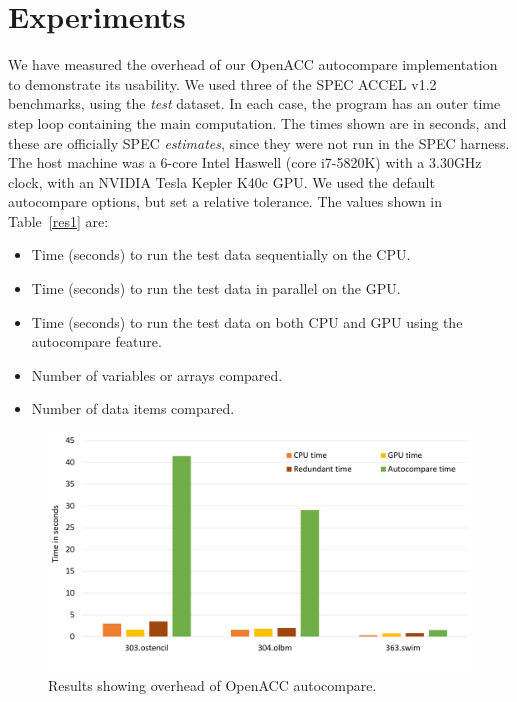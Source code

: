 \section{Experiments}

We have measured the overhead of our OpenACC autocompare implementation to demonstrate its usability.
We used three of the SPEC ACCEL v1.2 benchmarks, using the \emph{test} dataset.
In each case, the program has an outer time step loop containing the main computation.
The times shown are in seconds, and these are officially SPEC \emph{estimates}, since they were not run in the SPEC harness.
The host machine was a 6-core Intel Haswell (core i7-5820K) with a 3.30GHz clock, with an NVIDIA Tesla Kepler K40c GPU.
We used the default autocompare options, but set a relative tolerance.
The values shown in Table~\ref{res1} are:
\begin{itemize}
\item Time (seconds) to run the test data sequentially on the CPU.
\item Time (seconds) to run the test data in parallel on the GPU.
\item Time (seconds) to run the test data on both CPU and GPU using the autocompare feature.
\item Number of variables or arrays compared.
\item Number of data items compared.
\end{itemize}



\begin{figure}[t]
    \centering
    \includegraphics [width=\linewidth] {Table1.pdf}
    \caption{Results showing overhead of OpenACC autocompare.}
    \label{fig:sle_fiure}
\end{figure}




